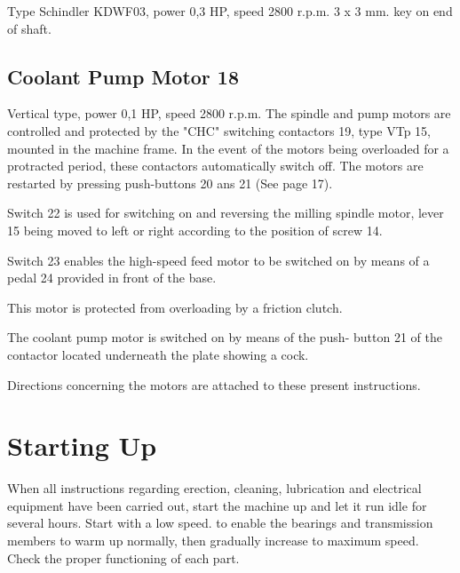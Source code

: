 Type Schindler KDWF03, power 0,3 HP, speed 2800 r.p.m. 3 x 3 mm.
key on end of shaft.

\subsection*{Coolant Pump Motor 18}

Vertical type, power 0,1 HP, speed 2800 r.p.m.
The spindle and pump motors are controlled and protected by the
"CHC" switching contactors 19, type VTp 15, mounted in the machine
frame. In the event of the motors being overloaded for a protracted
period, these contactors automatically switch off. The motors are
restarted by pressing push-buttons 20 ans 21 (See page 17).

Switch 22 is used for switching on and reversing the milling
spindle motor, lever 15 being moved to left or right according
to the position of screw 14.

Switch 23 enables the high-speed feed motor to be switched on
by means of a pedal 24 provided in front of the base.

This motor is protected from overloading by a friction clutch.

The coolant pump motor is switched on by means of the push-
button 21 of the contactor located underneath the plate showing
a cock.

Directions concerning the motors are attached to these present
instructions.

\section*{Starting Up}

When all instructions regarding erection, cleaning, lubrication
and electrical equipment have been carried out, start the machine
up and let it run idle for several hours. Start with a low speed.
to enable the bearings and transmission members to warm up
normally, then gradually increase to maximum speed. Check the
proper functioning of each part.
